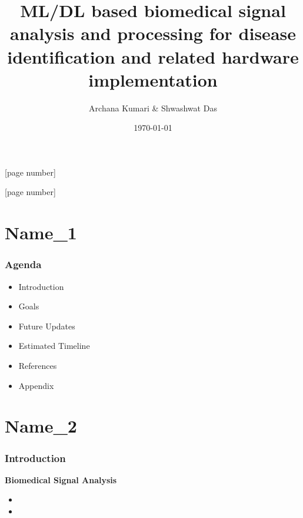 \documentclass{beamer}
\title[Biomedical Signal Analysis]{ML/DL based biomedical signal analysis and processing for disease identification and related hardware implementation } %
\author[Archana Kumari \& Shwashwat Das]{Archana Kumari \& Shwashwat Das}
\institute[STUDENT ID] %
{

{\small Supervisor} \\
\medskip
{\small Prof. Sumitra Mukhopadhyay }\\
\vspace{0.5cm}
Institute of Radiophysics and Electronics\\
University of Calcutta

}
\date[\today]{\today}
\begin{document}
\begin{frame}
\titlepage %
[page number]

\end{frame}
[page number]



\section{Name\_1} 
\begin{frame}[allowframebreaks]
\frametitle{Agenda}
\begin{itemize}
\item {Introduction}
\vspace{0.15cm}
\item {Goals}
\vspace{0.15cm}
\item {Future Updates}
\vspace{0.15cm}
\item {Estimated Timeline}

\vspace{0.15cm}
\item {References}
\vspace{0.15cm}
\item {Appendix}
\end{itemize}

\end{frame}



\section{Name\_2}
\begin{frame}[allowframebreaks]
\frametitle{Introduction}
\textbf{Biomedical Signal Analysis}
\vspace{0.3cm}
\begin{itemize}
\item 
\vspace{0.15cm}
\item 
\end{itemize}

\end{frame}
\end{document}
